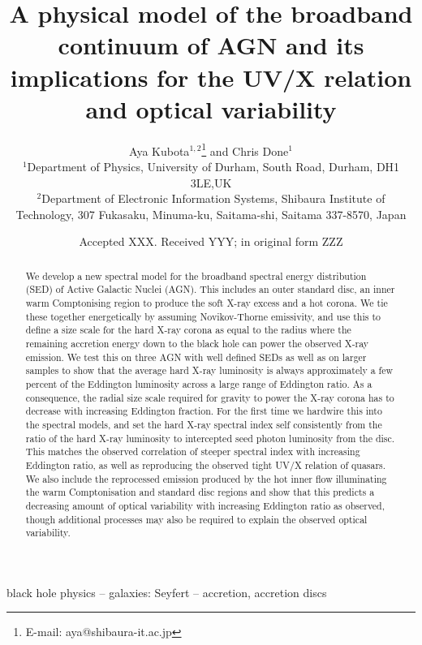 \documentclass[a4paper,fleqn,usenatbib]{mnras}
\title[A physical model of AGN SED]{A physical model of the broadband continuum
  of AGN and its implications for the UV/X relation and optical variability}
\author[A. Kubota \& C. Done.]{
Aya Kubota$^{1,2}$\thanks{E-mail: aya@shibaura-it.ac.jp }
and Chris Done$^{1}$
\\
$^{1}$Department of Physics, University of Durham, South Road, Durham, DH1 3LE,UK\\
$^{2}$Department of Electronic Information Systems, Shibaura Institute of Technology, 307 Fukasaku, Minuma-ku,   Saitama-shi, Saitama 337-8570, Japan\\
}
\date{Accepted XXX. Received YYY; in original form ZZZ}
\begin{document}
\label{firstpage}
\pagerange{\pageref{firstpage}--\pageref{lastpage}}
\maketitle

\begin{abstract}

 We develop a new spectral model for the broadband spectral energy distribution (SED) of Active Galactic Nuclei (AGN). This includes an outer standard disc, an inner warm Comptonising region to produce the soft X-ray excess and a hot corona. We tie these together energetically by assuming Novikov-Thorne emissivity, and use this to define a size scale for the hard X-ray corona as equal to the radius where the remaining accretion energy down to the black hole can power the observed X-ray emission. 
 We test this on three AGN with well defined SEDs as well as on larger samples to show that the average hard X-ray luminosity is always approximately a few percent of the Eddington luminosity across a large range of Eddington ratio.
 As a consequence, the radial size scale required for gravity to power the X-ray corona has to decrease with increasing Eddington fraction.
 For the first time we hardwire this into the spectral models, and set the hard X-ray spectral index self consistently from the ratio of the hard X-ray luminosity to intercepted seed photon luminosity from the disc. This matches the observed correlation of steeper spectral index with increasing Eddington ratio, as well as reproducing the observed tight UV/X relation of quasars. We also include the reprocessed emission produced by the hot inner flow illuminating the warm Comptonisation and standard disc regions and show that this predicts a decreasing amount of optical variability with increasing Eddington ratio as observed, though additional processes may also be required to explain the observed optical variability.

\end{abstract}

\begin{keywords}
black hole physics -- galaxies: Seyfert -- accretion, accretion discs
\end{keywords}

\end{document}
